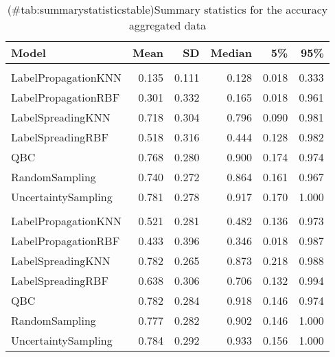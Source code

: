 \begin{table}[!h]

\caption{(\#tab:summarystatisticstable)Summary statistics for the accuracy aggregated data}
\centering
\begin{tabular}[t]{lrrrrr}
\toprule
Model & Mean & SD & Median & 5\% & 95\%\\
\midrule
\addlinespace[0.3em]
\multicolumn{6}{l}{\textbf{10\% labels available}}\\
\hspace{1em}LabelPropagationKNN & 0.135 & 0.111 & 0.128 & 0.018 & 0.333\\
\hspace{1em}LabelPropagationRBF & 0.301 & 0.332 & 0.165 & 0.018 & 0.961\\
\hspace{1em}LabelSpreadingKNN & 0.718 & 0.304 & 0.796 & 0.090 & 0.981\\
\hspace{1em}LabelSpreadingRBF & 0.518 & 0.316 & 0.444 & 0.128 & 0.982\\
\hspace{1em}QBC & 0.768 & 0.280 & 0.900 & 0.174 & 0.974\\
\hspace{1em}RandomSampling & 0.740 & 0.272 & 0.864 & 0.161 & 0.967\\
\hspace{1em}UncertaintySampling & 0.781 & 0.278 & 0.917 & 0.170 & 1.000\\
\addlinespace[0.3em]
\multicolumn{6}{l}{\textbf{50\% labels available}}\\
\hspace{1em}LabelPropagationKNN & 0.521 & 0.281 & 0.482 & 0.136 & 0.973\\
\hspace{1em}LabelPropagationRBF & 0.433 & 0.396 & 0.346 & 0.018 & 0.987\\
\hspace{1em}LabelSpreadingKNN & 0.782 & 0.265 & 0.873 & 0.218 & 0.988\\
\hspace{1em}LabelSpreadingRBF & 0.638 & 0.306 & 0.706 & 0.132 & 0.994\\
\hspace{1em}QBC & 0.782 & 0.284 & 0.918 & 0.146 & 0.974\\
\hspace{1em}RandomSampling & 0.777 & 0.282 & 0.902 & 0.146 & 1.000\\
\hspace{1em}UncertaintySampling & 0.784 & 0.292 & 0.933 & 0.156 & 1.000\\
\bottomrule
\end{tabular}
\end{table}
